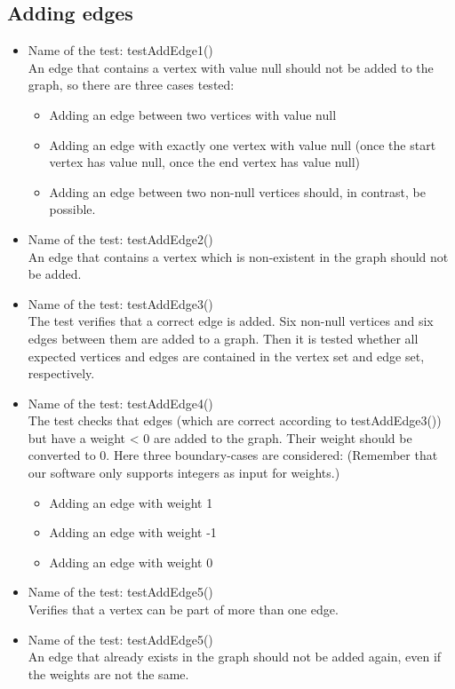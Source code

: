 \documentclass{article}
\begin{document}
\subsection{Adding edges}
\begin{itemize}
		\item Name of the test: testAddEdge1()\\
	An edge that contains a vertex with value null should not be added to the graph, so there are three cases tested:
	\begin{itemize}
		\item Adding an edge between two vertices with value null
		\item Adding an edge with exactly one vertex with value null (once the start vertex has value null, once the end vertex has value null)
		\item Adding an edge between two non-null vertices should, in contrast, be possible.
	\end{itemize}
	\item Name of the test: testAddEdge2() \\
	An edge that contains a vertex which is non-existent in the graph should not be added.
	\item  Name of the test: testAddEdge3() \\
	The test verifies that a correct edge is added. Six non-null vertices and six edges between them are added to a graph. Then it is tested whether all expected vertices and edges are contained in the vertex set and edge set, respectively.
	\item  Name of the test: testAddEdge4() \\
	The test checks that edges (which are correct according to testAddEdge3()) but have a weight < 0 are added to the graph. Their weight should be converted to 0. Here three boundary-cases are considered: (Remember that our software only supports integers as input for weights.)
	\begin{itemize}
		\item Adding an edge with weight 1
		\item Adding an edge with weight -1
		\item Adding an edge with weight 0
	\end{itemize}

	\item Name of the test: testAddEdge5()\\
	Verifies that a vertex can be part of more than one edge.
	\item Name of the test: testAddEdge5()\\
	An edge that already exists in the graph should not be added again, even if the weights are not the same.
\end{itemize}
\end{document}
